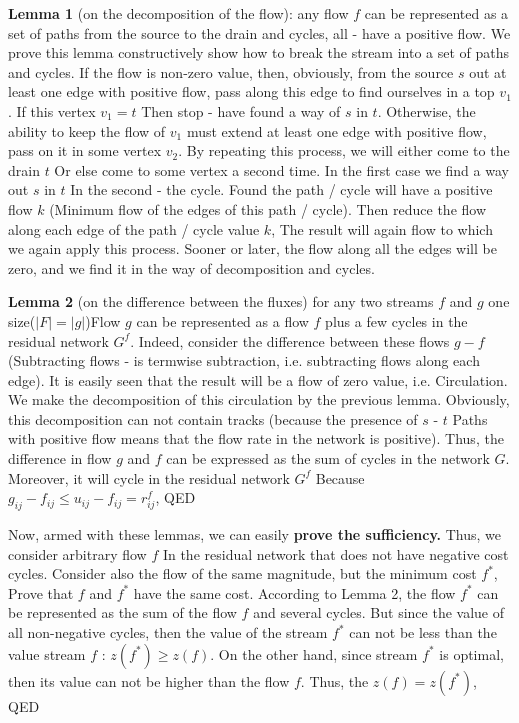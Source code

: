 \textbf{Lemma 1} (on the decomposition of the flow): any flow $f$ can be represented as a set of paths from the source to the drain and cycles, all - have a positive flow. We prove this lemma constructively show how to break the stream into a set of paths and cycles. If the flow is non-zero value, then, obviously, from the source $s$ out at least one edge with positive flow, pass along this edge to find ourselves in a top $v_1$. If this vertex $v_1 = t$ Then stop - have found a way of $s$ in $t$. Otherwise, the ability to keep the flow of $v_1$ must extend at least one edge with positive flow, pass on it in some vertex $v_2$. By repeating this process, we will either come to the drain $t$ Or else come to some vertex a second time. In the first case we find a way out $s$ in $t$ In the second - the cycle. Found the path / cycle will have a positive flow $k$ (Minimum flow of the edges of this path / cycle). Then reduce the flow along each edge of the path / cycle value $k$, The result will again flow to which we again apply this process. Sooner or later, the flow along all the edges will be zero, and we find it in the way of decomposition and cycles.

\textbf{Lemma 2} (on the difference between the fluxes) for any two streams $f$ and $g$ one size($| F | = | g |$)Flow $g$ can be represented as a flow $f$ plus a few cycles in the residual network $G ^ f$. Indeed, consider the difference between these flows $g-f$ (Subtracting flows - is termwise subtraction, i.e. subtracting flows along each edge). It is easily seen that the result will be a flow of zero value, i.e. Circulation. We make the decomposition of this circulation by the previous lemma. Obviously, this decomposition can not contain tracks (because the presence of $s$ - $t$ Paths with positive flow means that the flow rate in the network is positive). Thus, the difference in flow $g$ and $f$ can be expressed as the sum of cycles in the network $G$. Moreover, it will cycle in the residual network $G ^ f$ Because $g_ {ij} - f_ {ij} \le u_ {ij} - f_ {ij} = r_ {ij} ^ f$, QED

Now, armed with these lemmas, we can easily \textbf{prove the sufficiency.} Thus, we consider arbitrary flow $f$ In the residual network that does not have negative cost cycles. Consider also the flow of the same magnitude, but the minimum cost $f ^ *$, Prove that $f$ and $f ^ *$ have the same cost. According to Lemma 2, the flow $f ^ *$ can be represented as the sum of the flow $f$ and several cycles. But since the value of all non-negative cycles, then the value of the stream $f ^ *$ can not be less than the value stream $f$ : $z (f ^ *) \ge z (f)$. On the other hand, since stream $f ^ *$ is optimal, then its value can not be higher than the flow $f$. Thus, the $z (f) = z (f ^ *)$, QED

